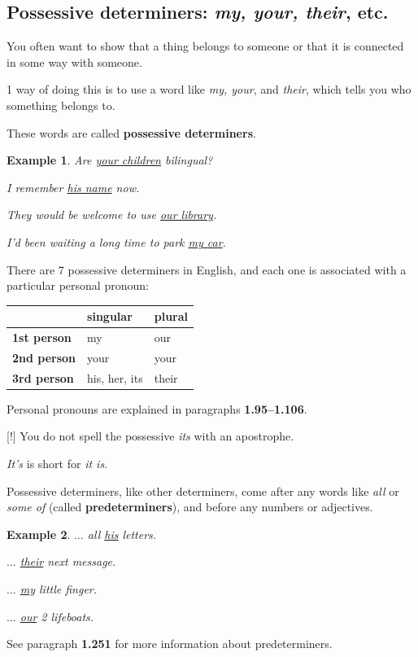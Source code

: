 \documentclass[oneside]{book}
\numberwithin{equation}{section}
\newtheorem{example}{Example}[section]
\begin{document}
\subsection{Possessive determiners: \textit{my, your, their}, etc.}
\noindent{} You often want to show that a thing belongs to someone or that it is connected in some way with someone.

%
1 way of doing this is to use a word like \textit{my, your}, and \textit{their}, which tells you who something belongs to.

These words are called \textbf{possessive determiners}.
\begin{example}
    Are \underline{your children} bilingual?
    
    I remember \underline{his name} now.
    
    They would be welcome to use \underline{our library}.
    
    I'd been waiting a long time to park \underline{my car}.
\end{example}
%
\noindent{} There are 7 possessive determiners in English, and each one is associated with a particular personal pronoun:
\begin{table}[H]
    \centering
    \begin{tabular}{|l|l|l|}
        \hline
        & \textbf{singular} & \textbf{plural} \\
        \hline
        \textbf{1st person} & my & our \\
        \hline
        \textbf{2nd person} & your & your \\
        \hline
        \textbf{3rd person} & his, her, its & their \\
        \hline
    \end{tabular}
\end{table}
Personal pronouns are explained in paragraphs \textbf{1.95--1.106}.

%
\noindent{} [!] You do not spell the possessive \textit{its} with an apostrophe.

\textit{It's} is short for \textit{it is}.

%
\noindent{} Possessive determiners, like other determiners, come after any words like \textit{all} or \textit{some of} (called \textbf{predeterminers}), and before any numbers or adjectives.
\begin{example}
    $\ldots$ all \underline{his} letters.
    
    $\ldots$ \underline{their} next message.
    
    $\ldots$ \underline{my} little finger.
    
    $\ldots$ \underline{our} 2 lifeboats.
\end{example}
See paragraph \textbf{1.251} for more information about predeterminers.
\end{document}
